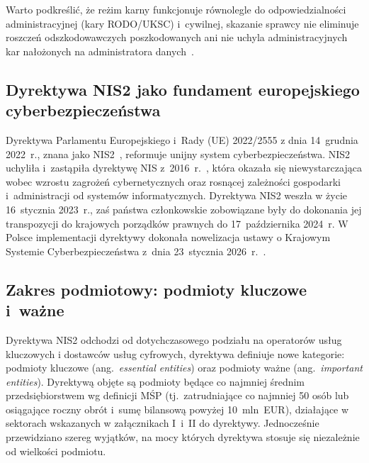 Warto podkreślić, że reżim karny funkcjonuje równolegle do odpowiedzialności administracyjnej (kary RODO/UKSC) i~cywilnej, skazanie sprawcy nie eliminuje
roszczeń odszkodowawczych poszkodowanych ani nie uchyla administracyjnych kar nałożonych na administratora danych~\autocites{kk1997}{rodo}.


\subsection{Dyrektywa NIS2 jako fundament europejskiego cyberbezpieczeństwa}

Dyrektywa Parlamentu Europejskiego i~Rady (UE) 2022/2555 z dnia 14~grudnia 2022~r., znana jako NIS2~\autocite{dyrektywa_nis2}, reformuje unijny system cyberbezpieczeństwa. NIS2 uchyliła i~zastąpiła dyrektywę NIS z~2016~r.~\autocite{dyrektywa_nis}, która  okazała się niewystarczająca wobec  wzrostu zagrożeń cybernetycznych oraz rosnącej zależności gospodarki i~administracji od systemów informatycznych.
Dyrektywa NIS2 weszła w życie 16~stycznia 2023~r., zaś państwa członkowskie zobowiązane były do dokonania jej transpozycji do krajowych porządków prawnych
do 17~października 2024~r. W Polsce implementacji dyrektywy dokonała nowelizacja ustawy o Krajowym Systemie Cyberbezpieczeństwa z~dnia 23~stycznia 2026~r.~\autocite{uksc2026}.

\subsection*{Zakres podmiotowy: podmioty kluczowe i~ważne}

Dyrektywa NIS2 odchodzi od dotychczasowego podziału na operatorów usług kluczowych
i dostawców usług cyfrowych, dyrektywa definiuje nowe kategorie: {podmioty kluczowe} (ang.\ \textit{essential entities}) oraz {podmioty ważne}
(ang.\ \textit{important entities}). 
Dyrektywą objęte są podmioty będące co najmniej średnim przedsiębiorstwem wg definicji MŚP\autocite{deficja_msp_2018} (tj.\ zatrudniające co najmniej 50 osób lub osiągające roczny obrót i~sumę bilansową powyżej 10~mln~EUR), działające w sektorach wskazanych w załącznikach I~i~II do dyrektywy. Jednocześnie przewidziano szereg wyjątków,
na mocy których dyrektywa stosuje się niezależnie od wielkości podmiotu.

